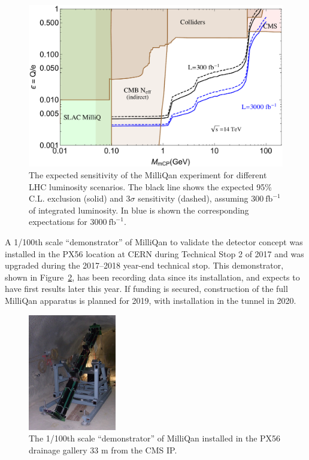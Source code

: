 \begin{figure}[h]
   \centering
   \includegraphics[width=0.9\linewidth]{figures/milliqan/exclusionplots_5b5.pdf}
   \caption{The expected sensitivity of the MilliQan experiment for different LHC luminosity scenarios. The black line shows the expected 95\% C.L. exclusion (solid) and $3\sigma$ sensitivity (dashed), assuming $300~\text{fb}^{-1}$ of integrated luminosity. In blue is shown the corresponding expectations for $3000~\text{fb}^{-1}$.
\label{fig:abc}}
\end{figure}

A 1/100th scale ``demonstrator'' of MilliQan to validate the detector concept was installed in the PX56 location at CERN during Technical Stop 2 of 2017 and was upgraded during the 2017--2018 year-end technical stop. This demonstrator, shown in Figure~\ref{fig:demo}, has been recording data since its installation, and expects to have first results later this year. If funding is secured, construction of the full MilliQan apparatus is planned for 2019, with installation in the tunnel in 2020.

\begin{figure}[h]
   \centering
   \includegraphics[width=0.5\linewidth]{figures/milliqan/RIMG0141.pdf}
   \caption{The 1/100th scale ``demonstrator'' of MilliQan installed in the PX56 drainage gallery 33 m from the CMS IP.
\label{fig:demo}}
\end{figure}

